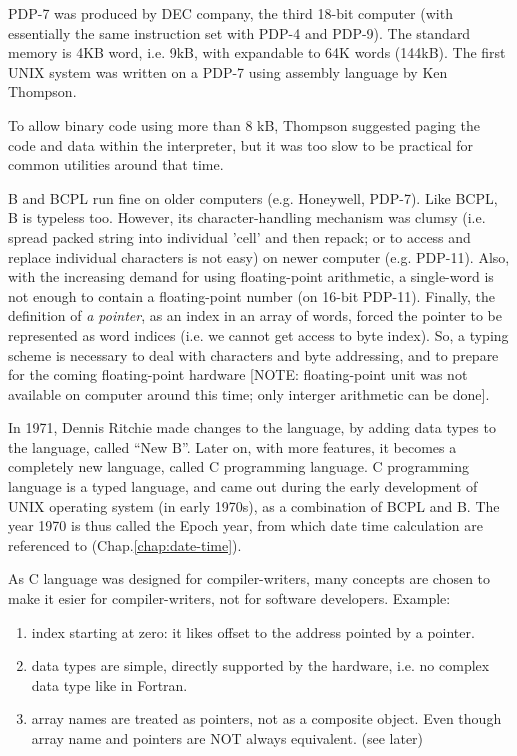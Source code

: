 \begin{mdframed}
PDP-7 was produced by DEC company, the third 18-bit computer (with essentially
the same instruction set with PDP-4 and PDP-9). The standard memory is 4KB
word, i.e. 9kB, with expandable to 64K words (144kB). The first UNIX system was
written on a PDP-7 using assembly language by Ken Thompson.
\end{mdframed}

To allow binary code using more than 8 kB, Thompson suggested paging the code
and data within the interpreter, but it was too slow to be practical for common
utilities around that time.

B and BCPL run fine on older computers (e.g. Honeywell, PDP-7). Like BCPL, B is
typeless too. However, its character-handling mechanism was clumsy (i.e. spread
packed string into individual 'cell' and then repack; or to access and replace
individual characters is not easy) on newer computer (e.g. PDP-11). Also, with
the increasing demand for using floating-point arithmetic, a single-word is not
enough to contain a floating-point number (on 16-bit PDP-11). Finally, the
definition of {\it a pointer}, as an index in an array of words, forced the
pointer to be represented as word indices (i.e. we cannot get access to byte
index). So, a typing scheme is necessary to deal with characters and byte
addressing, and to prepare for the coming floating-point hardware [NOTE:
floating-point unit was not available on computer around this time; only
interger arithmetic can be done].

In 1971, Dennis Ritchie made changes to the language, by adding data types to
the language, called ``New B''. Later on, with more features, it becomes a
completely new language, called C programming language. C programming language
is a typed language, and came out during the early development of UNIX operating
system (in early 1970s), as a combination of BCPL and B. The year 1970 is thus
called the Epoch year, from which date time calculation are referenced to
(Chap.\ref{chap:date-time}).

As C language was designed for compiler-writers, many concepts are chosen to
make it esier for compiler-writers, not for software developers. Example:
\begin{enumerate}
  \item index starting at zero: it likes offset to the address pointed by a
  pointer.
  \item data types are simple, directly supported by the hardware, i.e. no
  complex data type like in Fortran.
  \item array names are treated as pointers, not as a composite object. Even
  though array name and pointers are NOT always equivalent. (see later)
\end{enumerate}

